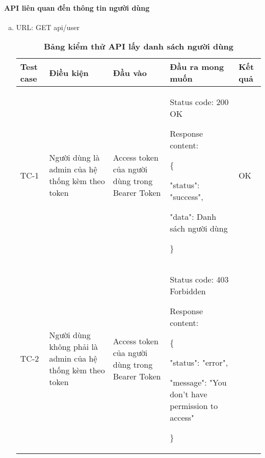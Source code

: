 \paragraph{API liên quan đến thông tin người dùng}
\mbox{}


\begin{enumerate}[a)]
  \item URL: GET api/user
  

  \begin{xltabular}{\textwidth}{
    | >{\raggedright\arraybackslash}p{1cm}
    | >{\raggedright\arraybackslash}p{2.5cm}
    | >{\raggedright\arraybackslash}p{3.5cm}
    | >{\raggedright\arraybackslash}X
    | >{\raggedright\arraybackslash}p{1cm}|
    }
    \caption{\bfseries \fontsize{12pt}{0pt}\selectfont Bảng kiểm thử API lấy danh sách người dùng}
    \\
    \hline
    \bfseries Test case    &\bfseries Điều kiện   &\bfseries Đầu vào 
    &\bfseries Đầu ra mong muốn &\bfseries Kết quả\\ \hline
  
  
    TC-1
    & Người dùng là admin của hệ thống kèm theo token
    & Access token của người dùng trong Bearer Token
  
    & 
  
    Status code: 200 OK
  
      Response content:
  
      \{
  
    "status": "success",
  
    "data": Danh sách người dùng
  
    \}
    
    & OK
  
    \\ \hline
  
    TC-2
    & Người dùng không phải là admin của hệ thống kèm theo token
    & Access token của người dùng trong Bearer Token
  
    & 
  
    Status code: 403 Forbidden
  
      Response content:
  
      \{
  
    "status": "error",
  
    "message": "You don't have permission to access"
  
    \}
    

\end{xltabular}
\end{enumerate}
